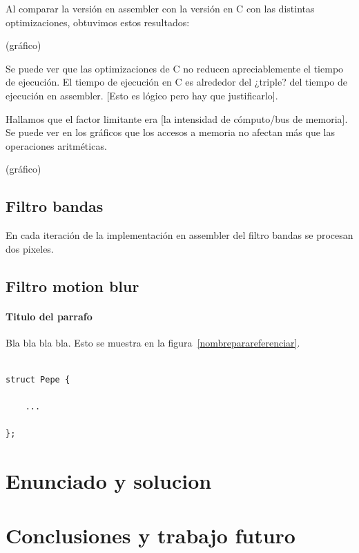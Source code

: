 \documentclass[a4paper]{article}
\begin{document}
Al comparar la versión en assembler con la versión en C con las distintas optimizaciones, obtuvimos estos resultados:

(gráfico)

Se puede ver que las optimizaciones de C {no} reducen apreciablemente el tiempo de ejecución. El tiempo de ejecución en C es alrededor del ¿triple? del tiempo de ejecución en assembler. [Esto es lógico pero hay que justificarlo].

Hallamos que el factor limitante era [la intensidad de cómputo/bus de memoria]. Se puede ver en los gráficos que los accesos a memoria {no} afectan más que las operaciones aritméticas.

(gráfico)

\subsection{Filtro bandas}
En cada iteración de la implementación en assembler del filtro bandas se procesan dos pixeles. 


\subsection{Filtro motion blur}



\paragraph{\textbf{Titulo del parrafo} } Bla bla bla bla.
Esto se muestra en la figura~\ref{nombreparareferenciar}.



\begin{codesnippet}
\begin{verbatim}

struct Pepe {

    ...

};

\end{verbatim}
\end{codesnippet}


\section{Enunciado y solucion} 


\section{Conclusiones y trabajo futuro}
\end{document}
